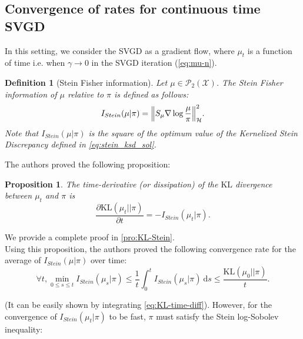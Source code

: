 \documentclass{article}
\newcommand{\X}{\mathcal{X}}
\renewcommand{\P}{\mathcal{P}}
\newcommand{\KL}{\mathrm{KL}}
\renewcommand{\H}{\mathcal{H}}
\newcommand{\diff}[2]{\frac{\partial #1}{\partial #2}}
\renewcommand{\d}{\: \mathrm{d}}
\newcommand{\Stein}{I_{Stein}(\mu | \pi)}
\DeclarePairedDelimiter{\norm}{\|}{\|}
\newtheorem{definition}{Definition}
\newtheorem{proposition}{Proposition}
\begin{document}
\subsection{Convergence of rates for continuous time SVGD}
In this setting, we consider the SVGD as a gradient flow, where $\mu_t$ is a function
of time i.e. when $\gamma \to 0$ in the SVGD iteration (\ref{eq:mu-n}).

\begin{definition}[Stein Fisher information]
  Let $\mu \in \P_2(\X)$. The Stein Fisher information of $\mu$ relative to
  $\pi$ is defined as follows:
  $$
  \Stein = \norm*{S_\mu \nabla \log \frac{\mu}{\pi}}_\H^2.
  $$
  Note that $\Stein$ is the square of the optimum value of the
  Kernelized Stein Discrepancy defined in \eqref{eq:stein_ksd_sol}.
\end{definition}

The authors proved the following proposition:
\begin{proposition}\label{prop:KL-Stein}
  The time-derivative (or dissipation) of the $\KL$ divergence between $\mu_t$ and $\pi$ is
  \begin{equation}
    \diff{\KL(\mu_t || \pi)}{t} = - I_{Stein}(\mu_t | \pi).
    \label{eq:KL-time-diff}
  \end{equation}
\end{proposition}
\noindent
We provide a complete proof in \ref{pro:KL-Stein}.\\

Using this proposition, the authors proved the following convergence rate
for the average of $\Stein$ over time:
\begin{equation}
  \forall t, \min_{0 \leq s \leq t} I_{Stein}(\mu_s | \pi)
    \leq \frac{1}{t} \int_0^t I_{Stein}(\mu_s | \pi) \d s
    \leq \frac{\KL(\mu_0 || \pi)}{t}.
  \label{eq:convergence-avg-stein}
\end{equation}

(It can be easily shown by integrating \eqref{eq:KL-time-diff}).
However, for the convergence of $I_{Stein}(\mu_t | \pi)$ to be fast,
$\pi$ must satisfy the Stein log-Sobolev inequality:
\end{document}
